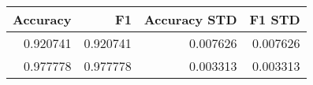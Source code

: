 \begin{tabular}{rrrr}
\toprule
Accuracy & F1 & Accuracy STD & F1 STD \\
\midrule
0.920741 & 0.920741 & 0.007626 & 0.007626 \\
0.977778 & 0.977778 & 0.003313 & 0.003313 \\
\bottomrule
\end{tabular}
